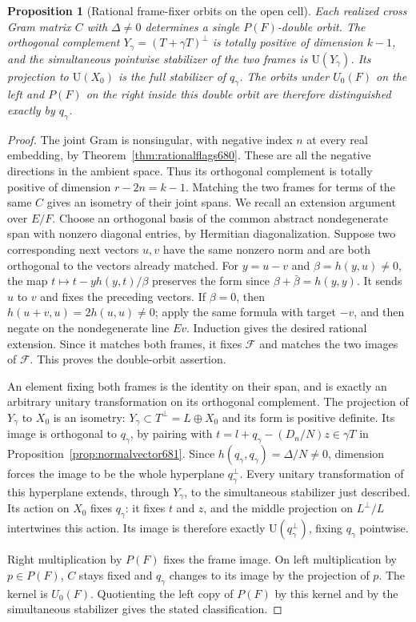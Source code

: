 \documentclass[a4paper,11pt]{article}
\newtheorem{proposition}{Proposition}[section]
\theoremstyle{definition}
\theoremstyle{remark}
\numberwithin{equation}{section}
\begin{document}
\begin{proposition}[Rational frame-fixer orbits on the open cell]
\leavevmode\label{prop:rationalorbits686}
Each realized cross Gram matrix \(C\) with \(\Delta\ne0\)
determines a single \(P(F)\)-double orbit. The orthogonal
complement \(Y_\gamma=(T+\gamma T)^\perp\) is totally positive
of dimension \(k-1\), and the simultaneous pointwise stabilizer
of the two frames is \(\mathrm U(Y_\gamma)\). Its projection to
\(\mathrm U(X_0)\) is the full stabilizer of \(q_\gamma\).
The orbits under \(U_0(F)\) on the left and \(P(F)\) on the
right inside this double orbit are therefore distinguished
exactly by \(q_\gamma\).
\end{proposition}
\begin{proof}
The joint Gram is nonsingular, with negative index \(n\)
at every real embedding, by Theorem~\ref{thm:rationalflags680}.
These are all the negative directions in the ambient space.
Thus its orthogonal complement is totally positive of dimension
\(r-2n=k-1\). Matching the two frames for terms of the same
\(C\) gives an isometry of their joint spans. We recall an
extension argument over \(E/F\). Choose an orthogonal basis of
the common abstract nondegenerate span with nonzero diagonal
entries, by Hermitian diagonalization. Suppose two corresponding
next vectors \(u,v\) have the same nonzero norm and are both
orthogonal to the vectors already matched. For \(y=u-v\) and
\(\beta=h(y,u)\ne0\), the map
\(t\mapsto t-yh(y,t)/\beta\) preserves the form since
\(\beta+\bar\beta=h(y,y)\). It sends \(u\) to \(v\) and fixes
the preceding vectors. If \(\beta=0\), then
\(h(u+v,u)=2h(u,u)\ne0\); apply the same formula with target
\(-v\), and then negate on the nondegenerate line \(Ev\).
Induction gives the desired rational extension. Since it
matches both frames, it fixes \(\mathcal F\) and matches the
two images of \(\mathcal F\). This proves the double-orbit
assertion.

An element fixing both frames is the identity on their span,
and is exactly an arbitrary unitary transformation on its
orthogonal complement. The projection of \(Y_\gamma\) to
\(X_0\) is an isometry: \(Y_\gamma\subset T^\perp=L\oplus X_0\)
and its form is positive definite. Its image is orthogonal to
\(q_\gamma\), by pairing with
\(t=l+q_\gamma-(D_n/N)z\in\gamma T\) in
Proposition~\ref{prop:normalvector681}. Since
\(h(q_\gamma,q_\gamma)=\Delta/N\ne0\), dimension forces the
image to be the whole hyperplane \(q_\gamma^\perp\).
Every unitary transformation of this hyperplane extends,
through \(Y_\gamma\), to the simultaneous stabilizer just
described. Its action on \(X_0\) fixes \(q_\gamma\): it fixes
\(t\) and \(z\), and the middle projection on \(L^\perp/L\)
intertwines this action. Its image is therefore exactly
\(\mathrm U(q_\gamma^\perp)\), fixing \(q_\gamma\) pointwise.

Right multiplication by \(P(F)\) fixes the frame image. On
left multiplication by \(p\in P(F)\), \(C\) stays fixed and
\(q_\gamma\) changes to its image by the projection of \(p\).
The kernel is \(U_0(F)\). Quotienting the left copy of \(P(F)\)
by this kernel and by the simultaneous stabilizer gives the
stated classification.
\end{proof}
\end{document}
